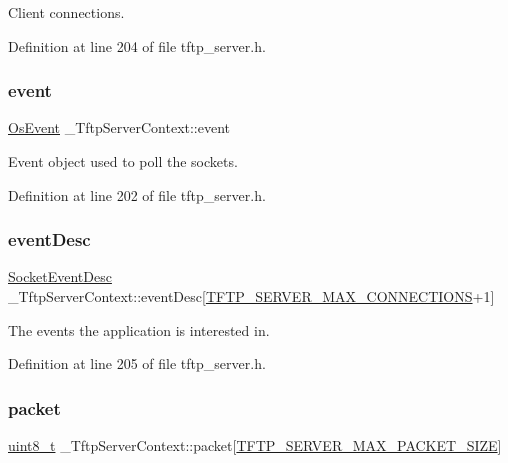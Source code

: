 Client connections. 



Definition at line 204 of file tftp\+\_\+server.\+h.

\mbox{\label{struct__TftpServerContext_af350a1fe0c7afb61743cdbf397f2e4d5}} 
\subsubsection{\texorpdfstring{event}{event}}
{\footnotesize\ttfamily \hyperlink{structOsEvent}{Os\+Event} \+\_\+\+Tftp\+Server\+Context\+::event}



Event object used to poll the sockets. 



Definition at line 202 of file tftp\+\_\+server.\+h.

\mbox{\label{struct__TftpServerContext_ae3e7783b2c32cdf0ef3b234a88819bbe}} 
\subsubsection{\texorpdfstring{event\+Desc}{eventDesc}}
{\footnotesize\ttfamily \hyperlink{structSocketEventDesc}{Socket\+Event\+Desc} \+\_\+\+Tftp\+Server\+Context\+::event\+Desc\mbox{[}\hyperlink{tftp__server_8h_a0acdd308af5bdb354e7a80dc8ff4388d}{T\+F\+T\+P\+\_\+\+S\+E\+R\+V\+E\+R\+\_\+\+M\+A\+X\+\_\+\+C\+O\+N\+N\+E\+C\+T\+I\+O\+NS}+1\mbox{]}}



The events the application is interested in. 



Definition at line 205 of file tftp\+\_\+server.\+h.

\mbox{\label{struct__TftpServerContext_a7f7fc903b14d60dccdd4229964e57ff7}} 
\subsubsection{\texorpdfstring{packet}{packet}}
{\footnotesize\ttfamily \hyperlink{stdint_8h_aba7bc1797add20fe3efdf37ced1182c5}{uint8\+\_\+t} \+\_\+\+Tftp\+Server\+Context\+::packet\mbox{[}\hyperlink{tftp__server_8h_a691c548eb2ec25b559ea9029f36a5276}{T\+F\+T\+P\+\_\+\+S\+E\+R\+V\+E\+R\+\_\+\+M\+A\+X\+\_\+\+P\+A\+C\+K\+E\+T\+\_\+\+S\+I\+ZE}\mbox{]}}



